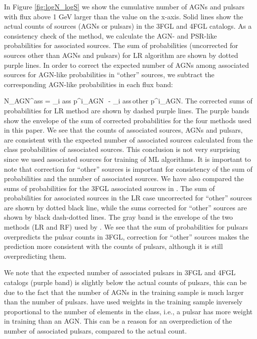 In Figure \ref{fig:logN_logS} we show the cumulative number of AGNs and pulsars with flux above 1 GeV larger than the
value on the x-axis.
Solid lines show the actual counts of sources (AGNs or pulsars) in the 3FGL and 4FGL catalogs.
As a consistency check of the method, we calculate the AGN- and PSR-like probabilities for associated sources.
The sum of probabilities (uncorrected for sources other than AGNs and pulsars) for LR algorithm are shown by dotted purple lines.
In order to correct the expected number of AGNs among associated sources for AGN-like probabilities in ``other'' sources, 
we subtract the corresponding AGN-like probabilities in each flux band:

\be
{}
N_{\rm AGN}^{\rm ass}  = \sum_{i \in \rm ass} p^i_{\rm AGN}\,\, - \sum_{i \in \rm ass\,other} p^i_{\rm AGN}.
\ee
The corrected sums of probabilities for LR method are shown by dashed purple lines.
The purple bands show the envelope of the sum of corrected probabilities for the four methods used in this paper.
We see that the counts of associated sources, AGNs and pulsars, are consistent with the expected number of associated sources
calculated from the class probabilities of associated sources.
This conclusion is not very surprising since we used associated sources for training of ML algorithms.
It is important to note that correction for ``other'' sources is important for consistency of the sum of probabilities and the number of associated sources.
We have also compared the sums of probabilities for the 3FGL associated sources in \cite{2016ApJ...820....8S}.%
The sum of probabilities for associated sources in the LR case uncorrected for ``other'' sources are shown by dotted black line,
while the sums corrected for ``other'' sources are shown by black dash-dotted lines.
The gray band is the envelope of the two methods (LR and RF) used by \cite{2016ApJ...820....8S}.
We see that the sum of probabilities for pulsars overpredicts the pulsar counts in 3FGL, correction for ``other'' sources makes the prediction 
more consistent with the counts of pulsars, although it is still overpredicting them.

We note that the expected number of associated pulsars in 3FGL and 4FGL catalogs (purple band) is slightly below the 
actual counts of pulsars, this can be due to the fact that the number of AGNs in the training sample is much larger than the number of pulsars.
\cite{2016ApJ...820....8S} have used weights in the training sample inversely proportional to the number of elements in the class,
i.e., a pulsar has more weight in training than an AGN.
This can be a reason for an overprediction of the number of associated pulsars, compared to the actual count.


